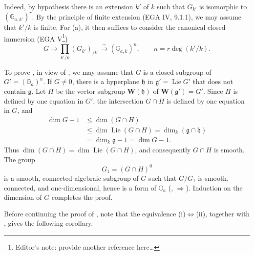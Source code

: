Indeed, by hypothesis there is an extension \(k'\) of \(k\) such
that \(G_{k'}\) is isomorphic to \((\mathbb G_{a,k'})^r\).  By the
principle of finite extension (EGA IV, 9.1.1), we may assume that
\(k'/k\) is finite.  For (a), it then suffices to consider the
canonical closed immersion (EGA V\footnote[5]{Editor's note:
provide another reference here\ldots})
\[
  G\longrightarrow
  \prod_{k'/k}(G_{k'})_{/k'}
  \xrightarrow{\ \sim\ }(\mathbb G_{a,k})^n,
  \qquad n=r\deg(k'/k).
\]

To prove , in view of , we may assume that \(G\) is a closed
subgroup of \(G'=(\mathbb G_a)^n\).  If \(G\ne0\), there is a
hyperplane \(\mathfrak h\) in
\(\mathfrak g'=\operatorname{Lie}G'\) that does not contain
\(\mathfrak g\).  Let \(H\) be the vector subgroup
\(\mathbf W(\mathfrak h)\) of
\(\mathbf W(\mathfrak g')=G'\).  Since \(H\) is defined by one
equation in \(G'\), the intersection \(G\cap H\) is defined by one
equation in \(G\), and
\[
\begin{aligned}
  \dim G-1
  &\leq \dim(G\cap H)\\
  &\leq \dim\operatorname{Lie}(G\cap H)
   =\dim_k(\mathfrak g\cap\mathfrak h)\\
  &=\dim_k\mathfrak g-1
   =\dim G-1.
\end{aligned}
\]
Thus
\(\dim(G\cap H)=\dim\operatorname{Lie}(G\cap H)\), and consequently
\(G\cap H\) is smooth.  The group
\[
  G_1=(G\cap H)^0
\]
is a smooth, connected algebraic subgroup of \(G\) such that
\(G/G_1\) is smooth, connected, and one-dimensional, hence is a
form of \(\mathbb G_a\) (, \(\Rightarrow\)).  Induction
on the dimension of \(G\) completes the proof.



Before continuing the proof of , note that the equivalence
(i)\(\Leftrightarrow\)(ii), together with , gives the
following corollary.


